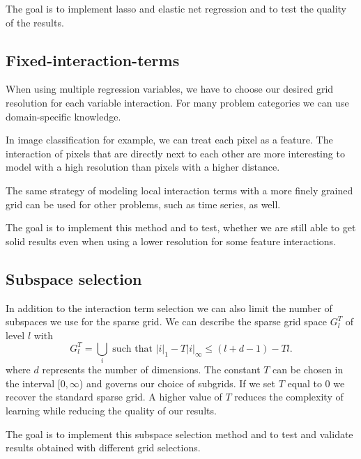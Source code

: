 \documentclass[11pt]{scrartcl}
\begin{document}
The goal is to implement lasso and elastic net regression and to test the quality of the results.
\subsection{Fixed-interaction-terms}
When using multiple regression variables, we have to choose our desired grid
resolution for each variable interaction.
For many problem categories we can use domain-specific knowledge. 

In image classification for example, we can treat each pixel as a feature.
The interaction of pixels that are directly next to each other are more
interesting to model with a high resolution than pixels with a higher distance.

The same strategy of modeling local interaction terms with a more finely
grained grid can be used for other problems, such as time series, as well.

The goal is to implement this method and to test,
whether we are still able to get solid results even when using a lower resolution for
some feature interactions.
\subsection{Subspace selection}
In addition to the interaction term selection we can also limit the number of
subspaces we use for the sparse grid. We can describe the sparse grid space
\(G^T_l\) of level \(l\) with
\begin{equation}
G^T_l = \bigcup_i \text{ such that } \left\vert i \right\vert_1 - T \left\vert i \right\vert_\infty \leq (l + d - 1) - T l.
\end{equation}
where \(d\) represents the number of dimensions. 
The constant \(T\) can be chosen in the interval \([0, \infty\)) and governs our
choice of subgrids. If we set \(T\) equal to \(0\) we recover the standard
sparse grid.
A higher value of \(T\) reduces the complexity of learning while reducing the
quality of our results.

The goal is to implement this subspace selection method and to test and
validate results obtained with different grid selections.
\end{document}
